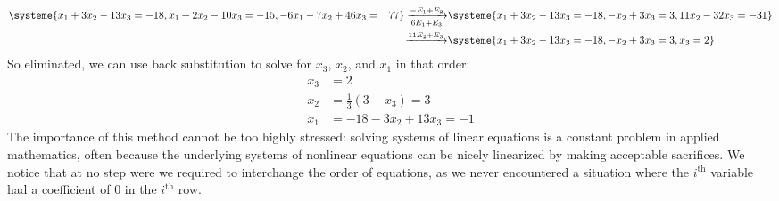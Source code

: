 \documentclass[m3380-lec-main.tex]{subfiles}
\begin{document}
\begin{exmp}
%
\begin{align}\label{eq:sys_elim}
\systeme{x_1 + 3x_2 - 13x_3 = -18, x_1 + 2x_2 - 10x_3 = -15, -6x_1 - 7x_2 + 46x_3 = \phantom{-}77}
	\xrightarrow[6E_1+E_3]{-E_1+E_2}
	&\systeme{x_1 + 3x_2 - 13x_3 = -18, {-x_2}+3x_3=3, 11x_2-32x_3=-31} \\ \nonumber
	\xto{11E_2+E_3}
	&\systeme{x_1 + 3x_2 - 13x_3 = -18, {-x_2}+3x_3=3, x_3=2}
\end{align}
%
%
\noindent So eliminated, we can use back substitution to solve for $x_3$, $x_2$, and $x_1$ in that order:
\begin{align*}
x_3 &= 2 \\
x_2 &= \frac1{3}\left(3+x_3\right) = 3 \\
x_1 &= -18-3x_2+13x_3 = -1
\end{align*}
The importance of this method cannot be too highly stressed: solving systems of linear equations is a constant problem in applied mathematics, often because the underlying systems of nonlinear equations can be nicely linearized by making acceptable sacrifices. We notice that at no step were we required to interchange the order of equations, as we never encountered a situation where the $i^\text{th}$ variable had a coefficient of $0$ in the $i^\text{th}$ row.
\end{exmp}
\end{document}

